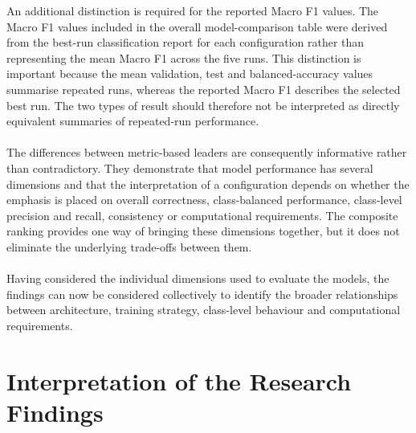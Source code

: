 \documentclass[12pt, a4paper]{report}
\let\oldsection\section
\renewcommand{\section}{%
    \Needspace{6\baselineskip}%
    \oldsection
}
\begin{document}
			An additional distinction is required for the reported Macro F1 values. The Macro F1 values included in the overall model-comparison table were derived from the best-run classification report for each configuration rather than representing the mean Macro F1 across the five runs. This distinction is important because the mean validation, test and balanced-accuracy values summarise repeated runs, whereas the reported Macro F1 describes the selected best run. The two types of result should therefore not be interpreted as directly equivalent summaries of repeated-run performance.\\\\
			The differences between metric-based leaders are consequently informative rather than contradictory. They demonstrate that model performance has several dimensions and that the interpretation of a configuration depends on whether the emphasis is placed on overall correctness, class-balanced performance, class-level precision and recall, consistency or computational requirements. The composite ranking provides one way of bringing these dimensions together, but it does not eliminate the underlying trade-offs between them.\\\\
			Having considered the individual dimensions used to evaluate the models, the findings can now be considered collectively to identify the broader relationships between architecture, training strategy, class-level behaviour and computational requirements.
			
		\section{Interpretation of the Research Findings}
			
\end{document}
